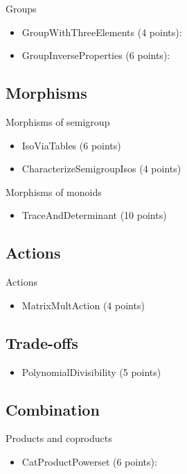 Groups
\begin{itemize}
    \item GroupWithThreeElements (4 points): 
    \item GroupInverseProperties (6 points): 
\end{itemize}

\subsection{Morphisms}
Morphisms of semigroup
\begin{itemize}
    \item IsoViaTables (6 points) 
    \item CharacterizeSemigroupIsos (4 points) 
\end{itemize}

Morphisms of monoids
\begin{itemize}
    \item TraceAndDeterminant (10 points) 
\end{itemize}

\subsection{Actions}

Actions
\begin{itemize}
    \item MatrixMultAction (4 points) 
\end{itemize}

\subsection{Trade-offs}

\begin{itemize}
\item PolynomialDivisibility (5 points) 
\end{itemize}

\subsection{Combination}

Products and coproducts
\begin{itemize}
    \item CatProductPowerset (6 points): 
\end{itemize}

